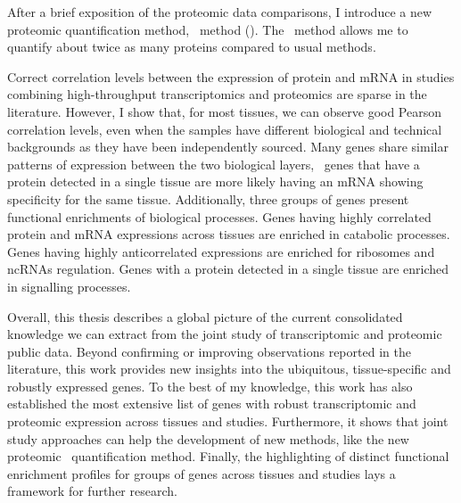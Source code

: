 \begin{singlespace}
{    After a brief exposition of the proteomic data comparisons,
    I introduce a new proteomic quantification method,
    \PPKM\ method ().
    The \PPKM\ method allows me to quantify about twice as many proteins
    compared to usual methods.\mybr\

    Correct correlation levels
    between the expression of protein and mRNA
    in studies combining high-throughput transcriptomics and proteomics
    are sparse in the literature.
    However, I show that, for most tissues,
    we can observe good Pearson correlation levels,
    even when the samples have different biological and technical backgrounds
    as they have been independently sourced.
    Many genes share similar patterns of expression
    between the two biological layers,
    \eg\ genes that have a protein detected in a single tissue
    are more likely having an mRNA showing specificity for the same tissue.
    Additionally, three groups of genes present functional enrichments
    of biological processes.
    Genes having highly correlated protein and mRNA expressions across tissues
    are enriched in catabolic processes.
    Genes having highly anticorrelated expressions are enriched
    for ribosomes and ncRNAs regulation.
    Genes with a protein detected in a single tissue are enriched
    in signalling processes.\mybr\

    Overall, this thesis describes a global picture
    of the current consolidated knowledge
    we can extract from the joint study
    of transcriptomic and proteomic public data.
    Beyond confirming or improving observations reported in the literature,
    this work provides new insights
    into the ubiquitous, tissue-specific and robustly expressed genes.
    To the best of my knowledge,
    this work has also established the most extensive list of genes
    with robust transcriptomic and proteomic expression across tissues and studies.
    Furthermore, it shows that joint study approaches can help the development
    of new methods, like the new proteomic \PPKM\ quantification method.
    Finally, the highlighting of distinct functional enrichment profiles
    for groups of genes across tissues and studies
    lays a framework for further research.\mybr\
    }
\end{singlespace}
